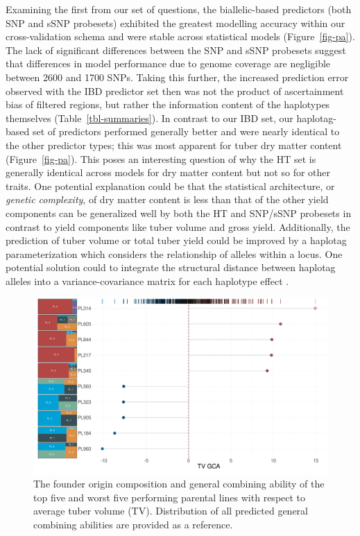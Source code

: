 Examining the first from our set of questions, the biallelic-based
predictors (both SNP and sSNP probesets) exhibited the greatest
modelling accuracy within our cross-validation schema and were stable
across statistical models (Figure~\ref{fig-pa}). The lack of significant
differences between the SNP and sSNP probesets suggest that differences in model performance due to
genome coverage are negligible between 2600 and 1700 SNPs. Taking this further, the
increased prediction error observed with the IBD predictor set then was
not the product of ascertainment bias of filtered regions, but rather the
information content of the haplotypes themselves (Table~\ref{tbl-summaries}). In contrast to
our IBD set, our haplotag-based set of predictors performed generally
better and were nearly identical to the other predictor types; this was most
apparent for tuber dry matter content (Figure~\ref{fig-pa}). This poses
an interesting question of why the HT set is generally identical across
models for dry matter content but not so for other traits. One potential
explanation could be that the statistical architecture, or \emph{genetic
complexity}, of dry matter content is less than that of the other yield
components can be generalized well by both the HT and SNP/sSNP probesets
in contrast to yield components like tuber volume and gross yield.
Additionally, the prediction of tuber volume or total tuber yield could
be improved by a haplotag parameterization which considers the
relationship of alleles within a locus. One potential solution could to
integrate the structural distance between haplotag alleles into a
variance-covariance matrix for each haplotype effect
\autocite{Schaid2004}.

\begin{figure}

{\centering \includegraphics{./figs_05/fig-gca-1.pdf}

}

\caption{\label{fig-gca}The founder origin composition and general
combining ability of the top five and worst five performing parental
lines with respect to average tuber volume (TV). Distribution of all
predicted general combining abilities are provided as a reference.}

\end{figure}


